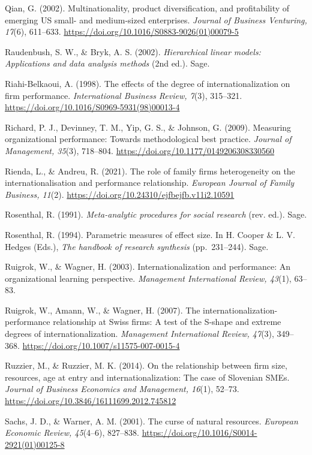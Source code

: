 \documentclass[
  a4paper,
  13pt]{extreport}
\begin{document}
Qian, G. (2002). Multinationality, product diversification, and
profitability of emerging US small- and medium-sized enterprises.
\emph{Journal of Business Venturing, 17}(6), 611--633.
\url{https://doi.org/10.1016/S0883-9026(01)00079-5}

Raudenbush, S. W., \& Bryk, A. S. (2002). \emph{Hierarchical linear
models: Applications and data analysis methods} (2nd ed.). Sage.

Riahi-Belkaoui, A. (1998). The effects of the degree of
internationalization on firm performance. \emph{International Business
Review, 7}(3), 315--321.
\url{https://doi.org/10.1016/S0969-5931(98)00013-4}

Richard, P. J., Devinney, T. M., Yip, G. S., \& Johnson, G. (2009).
Measuring organizational performance: Towards methodological best
practice. \emph{Journal of Management, 35}(3), 718--804.
\url{https://doi.org/10.1177/0149206308330560}

Rienda, L., \& Andreu, R. (2021). The role of family firms heterogeneity
on the internationalisation and performance relationship. \emph{European
Journal of Family Business, 11}(2).
\url{https://doi.org/10.24310/ejfbejfb.v11i2.10591}

Rosenthal, R. (1991). \emph{Meta-analytic procedures for social
research} (rev. ed.). Sage.

Rosenthal, R. (1994). Parametric measures of effect size. In H. Cooper
\& L. V. Hedges (Eds.), \emph{The handbook of research synthesis}
(pp.~231--244). Sage.

Ruigrok, W., \& Wagner, H. (2003). Internationalization and performance:
An organizational learning perspective. \emph{Management International
Review, 43}(1), 63--83.

Ruigrok, W., Amann, W., \& Wagner, H. (2007). The
internationalization-performance relationship at Swiss firms: A test of
the S-shape and extreme degrees of internationalization.
\emph{Management International Review, 47}(3), 349--368.
\url{https://doi.org/10.1007/s11575-007-0015-4}

Ruzzier, M., \& Ruzzier, M. K. (2014). On the relationship between firm
size, resources, age at entry and internationalization: The case of
Slovenian SMEs. \emph{Journal of Business Economics and Management,
16}(1), 52--73. \url{https://doi.org/10.3846/16111699.2012.745812}

Sachs, J. D., \& Warner, A. M. (2001). The curse of natural resources.
\emph{European Economic Review, 45}(4--6), 827--838.
\url{https://doi.org/10.1016/S0014-2921(01)00125-8}
\end{document}
